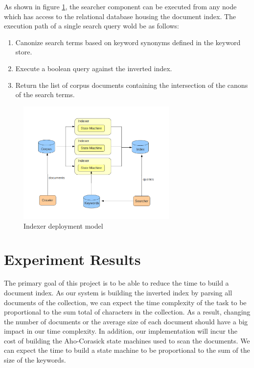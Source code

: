 \documentclass[10pt]{article}
\begin{document}
As shown in figure \ref{fig:deploymentmodel}, the searcher component
can be executed from any node which has access to the relational
database housing the document index. The execution path of a single
search query wold be as follows:

\begin{enumerate}
  \item Canonize search terms based on keyword synonyms defined in the
    keyword store.
  \item Execute a boolean query against the inverted index.
  \item Return the list of corpus documents containing the
    intersection of the canons of the search terms.
\end{enumerate}


\begin{figure}
  \begin{center}
        \includegraphics[width=0.70\textwidth,height=!]{deploymentmodel}
  \end{center}
  \caption{Indexer deployment model}
  \label{fig:deploymentmodel}
\end{figure} 


\section{Experiment Results}
\label{sec:experimentresults}
The primary goal of this project is to be able to reduce the time
to build a document index. As our system is building the inverted index by
parsing all documents of the collection, we can expect the
time complexity of the task to be proportional to the sum total of
characters in the collection. As a result, changing the  
number of documents or the average size of each document should
have a big impact in our time complexity. In addition, our
implementation will incur the cost of building the Aho-Corasick state
machines used to scan the documents. We can expect the time to build a
state machine to be proportional to the sum of the size of the
keywords. 
\end{document}
